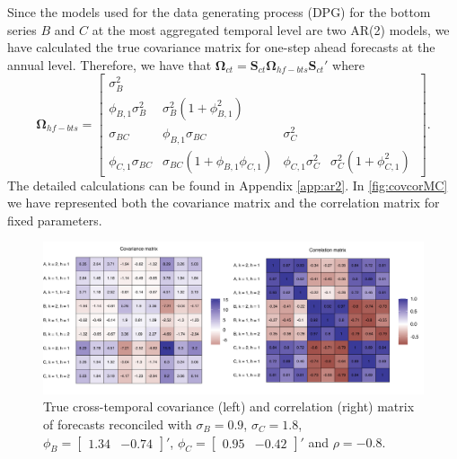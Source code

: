 \documentclass[a4paper,11pt]{article}
\newcommand{\Svet}{\bm{S}}
\newcommand{\Omegavet}{\bm{\Omega}}
\theoremstyle{definition}
\begin{document}
Since the models used for the data generating process (DPG) for the bottom series $B$ and $C$ at the most aggregated temporal level are two AR(2) models, we have calculated the true covariance matrix for one-step ahead forecasts at the annual level. Therefore, we have that $\Omegavet_{ct} = \Svet_{ct}\Omegavet_{hf-bts}\Svet_{ct}'$ where
$$
	\Omegavet_{hf-bts} = \begin{bmatrix}
		\sigma^2_B            &                                                 &                      &                                        \\
		\phi_{B,1}\sigma_B^2  & \sigma_B^2\left(1+\phi_{B,1}^2\right)           &                      &                                        \\
		\sigma_{BC}           & \phi_{B,1}\sigma_{BC}                           & \sigma_C^2           &                                        \\
		\phi_{C,1}\sigma_{BC} & \sigma_{BC}\left(1+\phi_{B,1}\phi_{C,1} \right) & \phi_{C,1}\sigma_C^2 & \sigma_C^2\left(1+\phi_{C,1}^2\right)\
	\end{bmatrix}.
$$
The detailed calculations can be found in Appendix \ref{app:ar2}.
In \autoref{fig:covcorMC} we have represented both the covariance matrix and the correlation matrix for fixed parameters.

\begin{figure}[!b]
	\centering
	\includegraphics[width = \linewidth]{fig/simAR/covcor.pdf}
	\caption{True cross-temporal covariance (left) and correlation (right) matrix of forecasts reconciled with $\sigma_B = 0.9$, $\sigma_C = 1.8$, $\phi_B =  \begin{bmatrix} 1.34 & -0.74 \end{bmatrix}'$, $\phi_C = \begin{bmatrix} 0.95 & -0.42 \end{bmatrix}'$ and $\rho = -0.8$.}
	\label{fig:covcorMC}
\end{figure}
\end{document}
